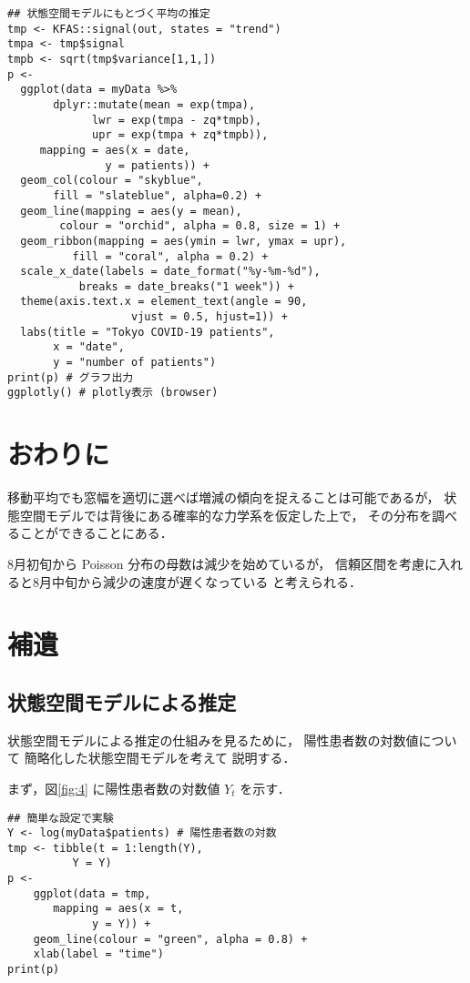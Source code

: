 \documentclass[10pt,oneside,fleqn]{scrartcl}
\begin{document}
\begin{verbatim}
## 状態空間モデルにもとづく平均の推定
tmp <- KFAS::signal(out, states = "trend")
tmpa <- tmp$signal
tmpb <- sqrt(tmp$variance[1,1,])
p <-
  ggplot(data = myData %>%
	   dplyr::mutate(mean = exp(tmpa),
			 lwr = exp(tmpa - zq*tmpb),
			 upr = exp(tmpa + zq*tmpb)),
	 mapping = aes(x = date,
		       y = patients)) +
  geom_col(colour = "skyblue",
	   fill = "slateblue", alpha=0.2) + 
  geom_line(mapping = aes(y = mean),
	    colour = "orchid", alpha = 0.8, size = 1) +
  geom_ribbon(mapping = aes(ymin = lwr, ymax = upr),
	      fill = "coral", alpha = 0.2) +
  scale_x_date(labels = date_format("%y-%m-%d"), 
	       breaks = date_breaks("1 week")) + 
  theme(axis.text.x = element_text(angle = 90, 
				   vjust = 0.5, hjust=1)) +
  labs(title = "Tokyo COVID-19 patients",
       x = "date",
       y = "number of patients")
print(p) # グラフ出力
ggplotly() # plotly表示 (browser)
\end{verbatim}

\section{おわりに}
\label{sec:org1bd3dbb}

移動平均でも窓幅を適切に選べば増減の傾向を捉えることは可能であるが，
状態空間モデルでは背後にある確率的な力学系を仮定した上で，
その分布を調べることができることにある．

8月初旬から Poisson 分布の母数は減少を始めているが，
信頼区間を考慮に入れると8月中旬から減少の速度が遅くなっている
と考えられる．

\section{補遺}
\label{sec:org25dca2b}
\subsection{状態空間モデルによる推定}
\label{sec:org5fc7918}

状態空間モデルによる推定の仕組みを見るために，
陽性患者数の対数値について
簡略化した状態空間モデルを考えて
説明する．

まず，図\ref{fig:4} に陽性患者数の対数値 \(Y_{t}\) を示す．
\begin{figure}[htbp]
  \centering
  \myGraph*{}
\end{figure}

\begin{verbatim}
## 簡単な設定で実験
Y <- log(myData$patients) # 陽性患者数の対数
tmp <- tibble(t = 1:length(Y),
	      Y = Y)
p <- 
    ggplot(data = tmp, 
	   mapping = aes(x = t,
			 y = Y)) +
    geom_line(colour = "green", alpha = 0.8) +
    xlab(label = "time")
print(p)
\end{verbatim}
\end{document}

